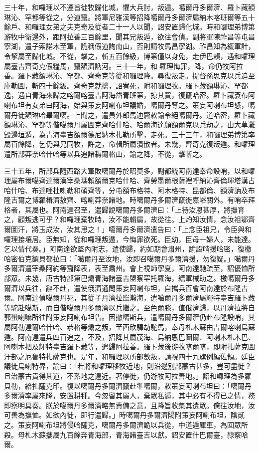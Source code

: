 \begin{pinyinscope}
三十年，和囉理以不遵旨徙牧歸化城，懼大兵討，叛遁。噶爾丹多爾濟、羅卜藏額琳沁、罕都等從之，分道竄。將軍尼雅漢等招降噶爾丹多爾濟屬納木喀班爾等五十餘戶、和囉理女弟之夫克奇及從者二十一人以聞，詔安置歸化城。時和囉理弟博第游牧中衛邊外，距阿拉善三百餘里，聞其兄叛遁，欲往會偵。副將軍陳祚昌等屯昌寧湖，遣子索諾木至軍，詭稱假道詢南山，否則請牧馬昌寧湖。祚昌知為緩軍計，令挈屬至歸化城。不從，擊之，斬五百餘級，博第僅以身免，走伊巴賴，遇和囉理屬臺吉齊奇克假糧馬，竄額濟訥河。三十一年，和羅理悔罪，降，命仍牧阿拉善。羅卜藏額琳沁、罕都、齊奇克等從和囉理降。尋復叛走。提督孫思克以兵追至庫勒圖，斬四十餘級。齊奇克就擒，詔宥死，附和囉理牧。羅卜藏額琳沁、罕都逸，遇自青海來歸之喀爾喀臺吉阿海岱青班第，掠其貲，復竄哈密。羅卜藏袞布阿喇布坦有女弟曰阿海，始與策妄阿喇布坦議婚，噶爾丹奪之。策妄阿喇布坦怒，噶爾丹徙額琳哈畢爾噶。上聞之，遣員外郎馬迪齎敕諭令絕噶爾丹。道哈密，羅卜藏額琳沁、罕都等偕噶爾丹屬圖克齊哈什哈、哈爾海達顏額爾克以兵劫之，由大草灘毀邊垣遁，為青海臺吉額爾德尼納木扎勒所擊，走死。三十三年，和囉理弟博第率屬百餘降，乞仍與兄同牧，許之，命輯所屬潰散者。未幾，齊奇克復叛遁。和囉理遣所部莽奈哈什哈等以兵追諸耨爾格山，諭之降，不從，擊斬之。

三十五年，所部兵隨西路大軍敗噶爾丹於昭莫多，副都統阿南達奉命設哨，以和囉理屬布爾噶齊達爾漢宰桑瑪賴額爾克哈什哈、齊勞墨爾根薩裡呼納沁齊倫琿塔漢占哈什哈、布達哩杜喇勒和碩齊等，分屯額布格特、阿木格特、昆都倫、額濟訥及布隆吉爾之博羅椿濟敖齊、喀喇莽奈諸地。時噶爾丹多爾濟竄徙嘉峪關外。有哨卒拜格者，其屬也。阿南達召至，遣歸說噶爾丹多爾濟曰：「上待汝恩甚厚，將撫育之，顧叛逃可乎？和囉理棄牧時，汝不能輯屬，故從往。上灼知汝情，念汝祖鄂齊爾圖汗，將玉成汝，汝其思之！」噶爾丹多爾濟遣告曰：「上念臣祖兄，令臣與和囉理接壤居。臣無知，從和囉理叛遁，今悔罪欲死。臣幼，臣母一婦人，未能達。乞以情代奏。」阿南達欲堅內附志，遣使歸，約如期會肅州，諭設哨援哈密，復檄哈密伯克額貝都拉曰：「噶爾丹至汝地，汝即召噶爾丹多爾濟援，勿復疑。」噶爾丹多爾濟遣宰桑阿約等齎降表，表至肅州。會上視師寧夏，阿南達馳疏至，詔優恤所部眾。未幾，唐古特部第巴煽青海諸臺吉盟察罕托羅海，繕軍械助之。檄噶爾丹多爾濟以兵往，辭不赴，遣使俄濟通問策妄阿喇布坦，自攜兵百會阿南達於布隆吉爾。阿南達偵噶爾丹死，其從子丹濟拉竄瀚海，遣噶爾丹多爾濟屬輝特臺吉羅卜藏等駝赴噶斯，而自偕噶爾丹多爾濟以兵繼之。至色爾滕，值俄濟歸，以丹濟拉將自郭蠻喇嘛所往附策妄阿喇布坦告。因撤噶斯兵，遣噶爾丹多爾濟仍赴布隆設哨，其屬阿勒達爾哈什哈、恭格等煽之叛，至西欣驛劫駝馬，奉母札木蘇由吉爾喀喇烏蘇遁。阿南達遣兵四百追之，不及，招降其屬茂海、烏納恩巴圖爾、阿喇木札木巴、阿喇木把及輝特臺吉羅卜藏等，遣歸阿拉善。羅卜藏後徙牧喀爾喀，即附扎薩克圖汗部之厄魯特扎薩克也。是年，和囉理以所部數叛，請視四十九旗例編佐領。廷臣議徙烏喇特界，諭曰：「若將和囉理移牧近地，則沿邊別部蒙古甚多，豈可盡徙？且治蒙古貴得其道，不系地之遠近。著停徙，仍游牧阿拉善地。」詔和囉理為多羅貝勒，給扎薩克印。復以噶爾丹多爾濟竄赴準噶爾，敕策妄阿喇布坦曰：「噶爾丹多爾濟率屬來降，安置耕種。今忽留其屬人，棄眾私遁，其中必有不得已之情，務即察明具奏。朕於噶爾丹多爾濟略無責備之意，且降旨收集其遺眾。儻往汝地，汝可善為撫恤。如欲內徙，即行遣歸。」時噶爾丹多爾濟陽附策妄阿喇布坦，陰貳之。策妄阿喇布坦將侵哈薩克，噶爾丹多爾濟詭以兵從，中道遁庫車，為回眾所殺。母札木蘇攜屬九百餘奔青海部，青海諸臺吉以獻。詔安置什巴爾臺，隸察哈爾。


\end{pinyinscope}
